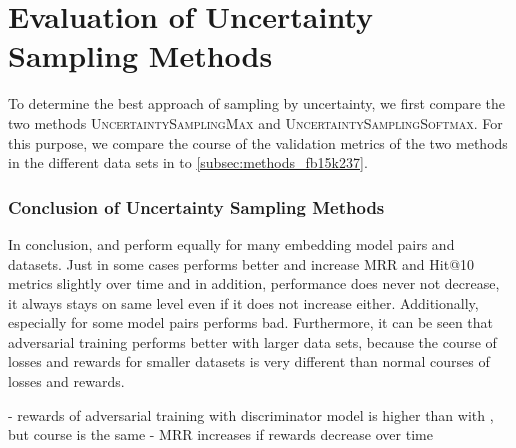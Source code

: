 \section{Evaluation of Uncertainty Sampling Methods}
\label{ch:evaluation:sec:evaluation_methods}

To determine the best approach of sampling by uncertainty, we first compare the two methods \textsc{UncertaintySamplingMax} and \textsc{UncertaintySamplingSoftmax}.
For this purpose, we compare the course of the validation metrics of the two methods in the different data sets in  to \ref{subsec:methods_fb15k237}.









\subsubsection{Conclusion of Uncertainty Sampling Methods}

In conclusion, \usmax and \ussoftmax perform equally for many embedding model pairs and datasets.
Just in some cases \ussoftmax performs better and increase MRR and Hit@10 metrics slightly over time and in addition, performance does never not decrease, it always stays on same level even if it does not increase either.
Additionally, especially for some model pairs \usmax performs bad.
Furthermore, it can be seen that adversarial training performs better with larger data sets, because the course of losses and rewards for smaller datasets is very different than normal courses of losses and rewards.


- rewards of adversarial training with \transe discriminator model is higher than with \transd, but course is the same
- MRR increases if rewards decrease over time

